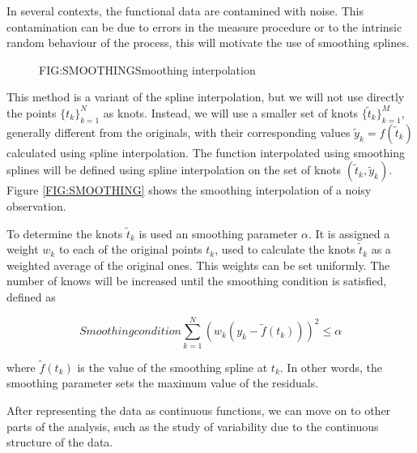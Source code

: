 
In several contexts, the functional data are contamined with noise.
This contamination can be due to errors in the measure procedure or to
the intrinsic random behaviour of the process,
this will motivate the use of smoothing splines.

\begin{figure}[Example of smoothing]{FIG:SMOOTHING}{Smoothing interpolation}
	 \quad
\end{figure}

This method is a variant of the spline interpolation, but we will not
use directly the points $\{t_k\}_{k=1}^{N}$ as knots. Instead, we will use a
smaller set of knots $\{\tilde t_k\}_{k=1}^{M}$, generally different from the
originals, with their corresponding values $\tilde y_k = f(\tilde t_k)$
calculated using spline interpolation. The function interpolated using smoothing
splines will be defined using spline interpolation on the set of knots
$(\tilde t_k, \tilde y_k)$. Figure \ref{FIG:SMOOTHING} shows the smoothing
interpolation of a noisy observation.

To determine the knots $\tilde t_k$ is used an smoothing parameter $\alpha$.
It is assigned a weight $w_k$ to each of the original points $t_k$, used to calculate
the knots $\tilde t_k$ as a weighted average of the original ones. This weights
can be set uniformly.
The number of knows will be increased until the smoothing condition is satisfied,
defined as

\begin{equation}[]{Smoothing condition}
\sum_{k=1}^N \left (  w_k (y_k - \tilde f(t_k)) \right)^2 \le \alpha
\end{equation}

where $\tilde f(t_k)$ is the value of the smoothing spline at $t_k$.
In other words, the smoothing parameter sets the maximum value of the residuals.

After representing the data as continuous functions, we can move on to other
parts of the analysis, such as the study of variability due to the continuous
structure of the data.
